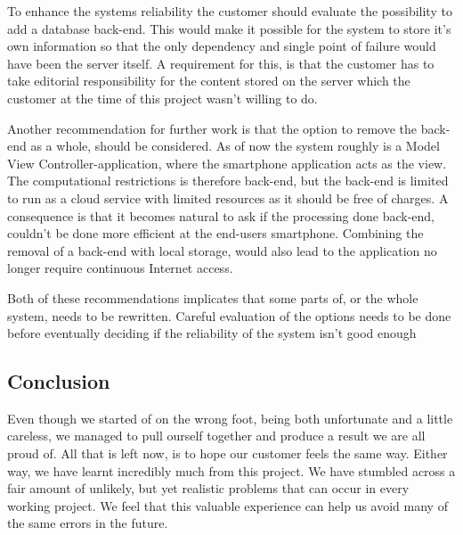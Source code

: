 To enhance the systems reliability the customer should evaluate the possibility to add a database back-end. This would make it possible for the system to store it's own information so that the only dependency and single point of failure would have been the server itself. A requirement for this, is that the customer has to take editorial responsibility for the content stored on the server which the customer at the time of this project wasn't willing to do.

Another recommendation for further work is that the option to remove the back-end as a whole, should be considered. As of now the system roughly is a Model View Controller-application, where the smartphone application acts as the view. The computational restrictions is therefore back-end, but the back-end is limited to run as a cloud service with limited resources as it should be free of charges. A consequence is that it becomes natural to ask if the processing done back-end, couldn't be done more efficient at the end-users smartphone. Combining the removal of a back-end with local storage, would also lead to the application no longer require continuous Internet access.

Both of these recommendations implicates that some parts of, or the whole system, needs to be rewritten. Careful evaluation of the options needs to be done before eventually deciding if the reliability of the system isn't good enough

 
\subsection{Conclusion}

Even though we started of on the wrong foot, being both unfortunate and a little careless, we managed to pull ourself together and produce a result we are all proud of. All that is left now, is to hope our customer feels the same way. Either way, we have learnt incredibly much from this project. We have stumbled across a fair amount of unlikely, but yet realistic problems that can occur in every working project. We feel that this valuable experience can help us avoid many of the same errors in the future.